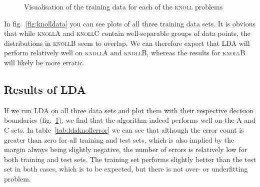 \documentclass{article}
\newcommand{\knollA}{\textsc{knollA}\xspace}
\newcommand{\knollB}{\textsc{knollB}\xspace}
\newcommand{\knollC}{\textsc{knollC}\xspace}
\begin{document}
\begin{figure}

  \caption{Visualisation of the training data for each of the \textsc{knoll} problems}
  \label{fig:ldaknollplots}
\end{figure}

In fig.~\ref{fig:knolldata} you can see plots of all three training data sets. It is obvious
that while \knollA and \knollC contain well-separable groups of data points, the distributions in \knollB
seem to overlap. We can therefore expect that LDA will perform relatively well on \knollA and \knollB, whereas
the results for \knollB will likely be more erratic. 

\subsection{Results of LDA}
If we run LDA on all three data sets and plot them with their respective decision boundaries (fig.~\ref{fig:ldaknollplots}), we find 
that the algorithm indeed performs well on the A and C sets. In table~\ref{tab:ldaknollerror} we can see that although the error count is greater than zero for all 
training and test sets, which is also implied by the margin always being slightly negative, the number of errors
is relatively low for both training and test sets. The training set performs slightly better than the test set in both 
cases, which is to be expected, but there is not over- or underfitting problem.
\end{document}
